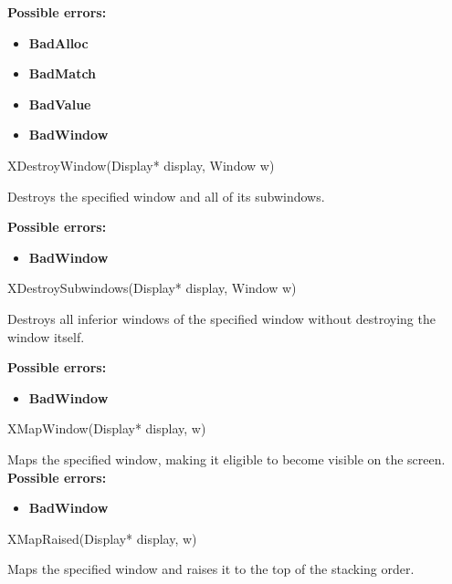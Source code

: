\documentclass{report}
\begin{document}
\begin{itemize}
            \bigbreak \noindent
            \textbf{Possible errors:}
            \begin{itemize}
                \item \textbf{BadAlloc}
                \item \textbf{BadMatch}
                \item \textbf{BadValue}
                \item \textbf{BadWindow}
            \end{itemize}

            \begin{cppcode}
                XDestroyWindow(Display* display, Window w)
            \end{cppcode}
            \bigbreak \noindent
            Destroys the specified window and all of its subwindows.

            \bigbreak \noindent
            \textbf{Possible errors:}
            \begin{itemize}
                \item \textbf{BadWindow}
            \end{itemize}

            \begin{cppcode}
                XDestroySubwindows(Display* display, Window w) 
            \end{cppcode}
            \bigbreak \noindent
            Destroys all inferior windows of the specified window without destroying the window itself.

            \bigbreak \noindent
            \textbf{Possible errors:}
            \begin{itemize}
                \item \textbf{BadWindow}
            \end{itemize}

            \begin{cppcode}
                XMapWindow(Display* display, w)
            \end{cppcode}
            \bigbreak \noindent
            Maps the specified window, making it eligible to become visible on the screen.
            \bigbreak \noindent
            \textbf{Possible errors:}
            \begin{itemize}
                \item \textbf{BadWindow}
            \end{itemize}

            \begin{cppcode}
                XMapRaised(Display* display, w)
            \end{cppcode}
            \bigbreak \noindent
            Maps the specified window and raises it to the top of the stacking order.


\end{itemize}
\end{document}
